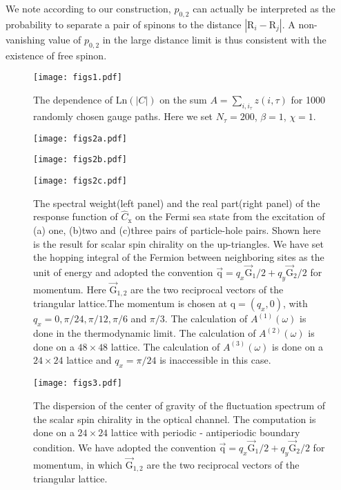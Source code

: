 \documentclass[12pt]{article}
\begin{document}
We note according to our construction, $p_{0,2}$ can actually be interpreted as the probability to separate a pair of spinons to the distance $|\mathrm{R}_{i}-\mathrm{R}_{j}|$. A non-vanishing value of $p_{0,2}$ in the large distance limit is thus consistent with the existence of free spinon. 




\clearpage


\setcounter{figure}{0}
\begin{figure}[h!]
\texttt{[image: figs1.pdf]}
\caption{The dependence of $\mathrm{Ln}(|C|)$ on the sum $A=\sum_{i,i_{\tau}}z(i,\tau)$ for 1000 randomly chosen gauge paths. Here we set $N_{\tau}=200$, $\beta=1$, $\chi=1$.}
\end{figure}

\begin{figure}[h!]
\texttt{[image: figs2a.pdf]}
\end{figure}
\begin{figure}[h!]
\texttt{[image: figs2b.pdf]}
\end{figure}

\begin{figure}[h!]
\texttt{[image: figs2c.pdf]}
\caption{The spectral weight(left panel) and the real part(right panel) of the response function of $\hat{C}_{\mathrm{x}}$ on the Fermi sea state from the excitation of (a) one, (b)two and (c)three pairs of particle-hole pairs. Shown here is the result for scalar spin chirality on the up-triangles. We have set the hopping integral of the Fermion between neighboring sites as the unit of energy and adopted the convention $\vec{\mathrm{q}}=q_{x}\vec{\mathrm{G}}_{1}/2+q_{y}\vec{\mathrm{G}}_{2}/2$ for momentum. Here $\vec{\mathrm{G}}_{1,2}$ are the two reciprocal vectors of the triangular lattice.The momentum is chosen at $\mathrm{q}=(q_{x},0)$, with $q_{x}=0,\pi/24,\pi/12,\pi/6$ and $\pi/3$. The calculation of $A^{(1)}(\omega)$ is done in the thermodynamic limit. The calculation of $A^{(2)}(\omega)$ is done on a $48\times48$ lattice. The calculation of $A^{(3)}(\omega)$ is done on a $24\times24$ lattice and $q_{x}=\pi/24$ is inaccessible in this case.}
\end{figure}


\begin{figure}[h!]
\texttt{[image: figs3.pdf]}
\caption{The dispersion of the center of gravity of the fluctuation spectrum of the scalar spin chirality in the optical channel. The computation is done on a $24\times 24$ lattice with periodic - antiperiodic boundary condition. We have adopted the convention $\vec{\mathrm{q}}=q_{x}\vec{\mathrm{G}}_{1}/2+q_{y}\vec{\mathrm{G}}_{2}/2$ for momentum, in which $\vec{\mathrm{G}}_{1,2}$ are the two reciprocal vectors of the triangular lattice.}
\end{figure}
\end{document}
